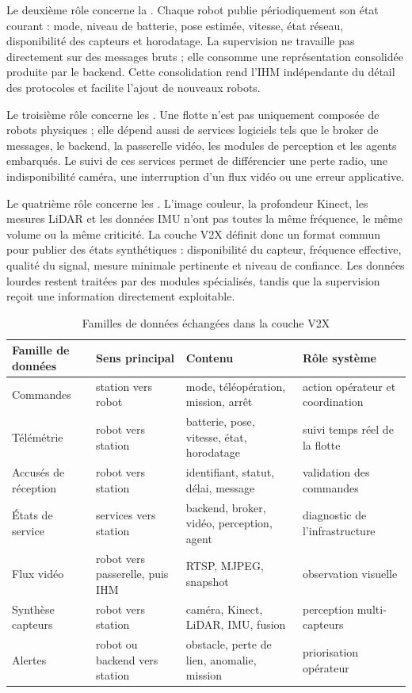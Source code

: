 Le deuxième rôle concerne la . Chaque robot publie périodiquement son état courant : mode, niveau de batterie, pose estimée, vitesse, état réseau, disponibilité des capteurs et horodatage. La supervision ne travaille pas directement sur des messages bruts ; elle consomme une représentation consolidée produite par le backend. Cette consolidation rend l'IHM indépendante du détail des protocoles et facilite l'ajout de nouveaux robots.

Le troisième rôle concerne les . Une flotte n'est pas uniquement composée de robots physiques ; elle dépend aussi de services logiciels tels que le broker de messages, le backend, la passerelle vidéo, les modules de perception et les agents embarqués. Le suivi de ces services permet de différencier une perte radio, une indisponibilité caméra, une interruption d'un flux vidéo ou une erreur applicative.

Le quatrième rôle concerne les . L'image couleur, la profondeur Kinect, les mesures LiDAR et les données IMU n'ont pas toutes la même fréquence, le même volume ou la même criticité. La couche V2X définit donc un format commun pour publier des états synthétiques : disponibilité du capteur, fréquence effective, qualité du signal, mesure minimale pertinente et niveau de confiance. Les données lourdes restent traitées par des modules spécialisés, tandis que la supervision reçoit une information directement exploitable.

\begin{table}[H]
\centering
\small
\renewcommand{\arraystretch}{1.18}
\begin{tabular}{|p{3.4cm}|p{3.0cm}|p{4.5cm}|p{4.0cm}|}
\hline
\textbf{Famille de données} & \textbf{Sens principal} & \textbf{Contenu} & \textbf{Rôle système} \\
\hline
Commandes & station vers robot & mode, téléopération, mission, arrêt & action opérateur et coordination \\
\hline
Télémétrie & robot vers station & batterie, pose, vitesse, état, horodatage & suivi temps réel de la flotte \\
\hline
Accusés de réception & robot vers station & identifiant, statut, délai, message & validation des commandes \\
\hline
États de service & services vers station & backend, broker, vidéo, perception, agent & diagnostic de l'infrastructure \\
\hline
Flux vidéo & robot vers passerelle, puis IHM & RTSP, MJPEG, snapshot & observation visuelle \\
\hline
Synthèse capteurs & robot vers station & caméra, Kinect, LiDAR, IMU, fusion & perception multi-capteurs \\
\hline
Alertes & robot ou backend vers station & obstacle, perte de lien, anomalie, mission & priorisation opérateur \\
\hline
\end{tabular}
\caption{Familles de données échangées dans la couche V2X}
\label{tab:v2x_messages_v2}
\end{table}

